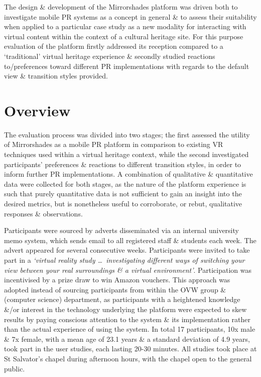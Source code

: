 The design \& development of the Mirrorshades platform was driven both to investigate mobile PR systems as a concept in general \& to assess their suitability when applied to a particular case study as a new modality for interacting with virtual content within the context of a cultural heritage site. For this purpose evaluation of the platform firstly addressed its reception compared to a `traditional' virtual heritage experience \& secondly studied reactions to/preferences toward different PR implementations with regards to the default view \& transition styles provided.




\section{Overview}

The evaluation process was divided into two stages; the first assessed the utility of Mirrorshades as a mobile PR platform in comparison to existing VR techniques used within a virtual heritage context, while the second investigated participants' preferences \& reactions to different transition styles, in order to inform further PR implementations. A combination of qualitative \& quantitative data were collected for both stages, as the nature of the platform experience is such that purely quantitative data is not sufficient to gain an insight into the desired metrics, but is nonetheless useful to corroborate, or rebut, qualitative responses \& observations.

Participants were sourced by adverts disseminated via an internal university memo system, which sends email to all registered staff \& students each week. The advert appeared for several consecutive weeks. Participants were invited to take part in a \textit{`virtual reality study \ldots\ investigating different ways of switching your view between your real surroundings \& a virtual environment'}. Participation was incentivised by a prize draw to win Amazon vouchers. This approach was adopted instead of sourcing participants from within the OVW group \& (computer science) department, as participants with a heightened knowledge \&/or interest in the technology underlying the platform were expected to skew results by paying conscious attention to the system \& its implementation rather than the actual experience of using the system. In total 17 participants, 10x male \& 7x female, with a mean age of 23.1 years \& a standard deviation of 4.9 years, took part in the user studies, each lasting 20-30 minutes. All studies took place at St Salvator's chapel during afternoon hours, with the chapel open to the general public.


